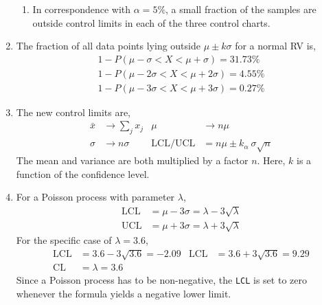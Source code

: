 \begin{enumerate}
\begin{enumerate}
              \item In correspondence with $ \alpha = 5\% $, a small fraction of
                    the samples are outside control limits in each of the three control
                    charts.
          \end{enumerate}

    \item The fraction of all data points lying outside $ \mu \pm k\sigma $ for a normal
          RV is,
          \begin{align}
              1 - P(\mu - \sigma < X < \mu + \sigma) = 31.73\%  \\
              1 - P(\mu - 2\sigma < X < \mu + 2\sigma) = 4.55\% \\
              1 - P(\mu - 3\sigma < X < \mu + 3\sigma) = 0.27\%
          \end{align}

    \item The new control limits are,
          \begin{align}
              \bar{x}               & \to \sum_j x_j                      &
              \mu                   & \to n\mu                              \\
              \sigma                & \to n\sigma                         &
              \text{LCL}/\text{UCL} & = n\mu \pm k_\alpha\ \sigma\sqrt{n}
          \end{align}
          The mean and variance are both multiplied by a factor $ n $. Here, $ k $
          is a function of the confidence level.

    \item For a Poisson process with parameter $ \lambda $,
          \begin{align}
              \text{LCL} & = \mu - 3\sigma
              = \lambda - 3\sqrt{\lambda}  \\
              \text{UCL} & = \mu + 3\sigma
              = \lambda + 3\sqrt{\lambda}
          \end{align}
          For the specific case of $ \lambda = 3.6 $,
          \begin{align}
              \text{LCL} & = 3.6 - 3\sqrt{3.6} = -2.09 &
              \text{LCL} & = 3.6 + 3\sqrt{3.6} = 9.29    \\
              \text{CL}  & = \lambda = 3.6
          \end{align}
          Since a Poisson process has to be non-negative, the \texttt{LCL} is set to
          zero whenever the formula yields a negative lower limit.

\end{enumerate}